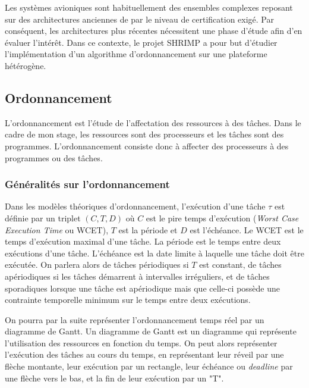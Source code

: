 Les systèmes avioniques sont habituellement des ensembles complexes reposant sur des architectures anciennes de par le niveau de certification exigé. Par conséquent, les architectures plus récentes nécessitent une phase d'étude afin d'en évaluer l'intérêt. Dans ce contexte, le projet SHRIMP a pour but d'étudier l'implémentation d'un algorithme d'ordonnancement sur une plateforme hétérogène.   

\subsection{Ordonnancement}

L'ordonnancement est l'étude de l'affectation des ressources à des tâches. Dans le cadre de mon stage, les ressources sont des processeurs et les tâches sont des programmes. L'ordonnancement consiste donc à affecter des processeurs à des programmes ou des tâches.

\subsubsection{Généralités sur l'ordonnancement}


Dans les modèles théoriques d'ordonnancement, l'exécution d'une tâche $\tau$ est définie par un triplet $(C,T,D)$ où $C$ est le pire temps d'exécution (\textit{Worst Case Execution Time} ou WCET), $T$ est la période et $D$ est l'échéance. Le WCET est le temps d'exécution maximal d'une tâche. La période est le temps entre deux exécutions d'une tâche. L'échéance est la date limite à laquelle une tâche doit être exécutée. On parlera alors de tâches périodiques si $T$ est constant, de tâches apériodiques si les tâches démarrent à intervalles irréguliers, et de tâches sporadiques lorsque une tâche est apériodique mais que celle-ci   possède une contrainte temporelle minimum sur le temps entre deux exécutions.

On pourra par la suite représenter l'ordonnancement temps réel par un diagramme de Gantt. Un diagramme de Gantt est un diagramme qui représente l'utilisation des ressources en fonction du temps. On peut alors représenter l'exécution des tâches au cours du temps, en représentant leur réveil par une flèche montante, leur exécution par un rectangle, leur échéance ou \textit{deadline} par une flèche vers le bas, et la fin de leur exécution par un "T". 

